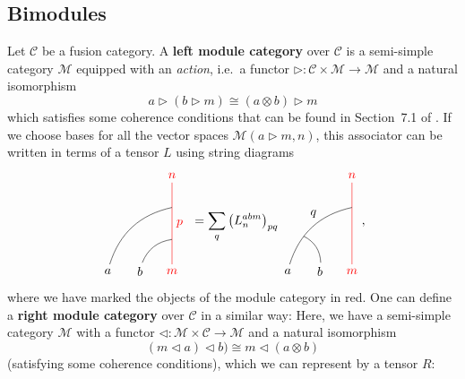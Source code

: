 \subsection{Bimodules}

\begin{definition}
	Let $\mathcal{C}$ be a fusion category. A \textbf{left module category} over $\mathcal{C}$ is a semi-simple category $\mathcal{M}$ equipped with an \emph{action}, i.e.\ a functor $\triangleright:\mathcal{C}\times\mathcal{M}\to\mathcal{M}$ and a natural isomorphism 
		\begin{equation}
			a\triangleright(b\triangleright m)\cong(a\otimes b)\triangleright m
		\end{equation}
	which satisfies some coherence conditions that can be found in Section~7.1 of \cite{Etingof2015}. If we choose bases for all the vector spaces $\mathcal{M}(a\triangleright m,n)$, this associator can be written in terms of a tensor $L$ using string diagrams
		\begin{equation}
			\begin{tikzpicture}[scale=0.9,baseline=(current bounding box.center)]
			\node[red](m) at (0,0) {$m$};
			\node(b) at (-1,0) {$b$};
			\node(a) at (-2,0) {$a$};
			\node[red](abm) at (0,3) {$n$};
			\draw[red] (m) to node[right] {$p$} (abm);
			\draw (b) to [bend left] (0,1);
			\draw (a) to [bend left] (0,2);
			\end{tikzpicture}\ =\sum_q \left(L_n^{abm}\right)_{pq}
			\begin{tikzpicture}[scale=0.9,baseline=(current bounding box.center)]
			\node[red](m) at (0,0) {$m$};
			\node(b) at (-1,0) {$b$};
			\node(a) at (-2,0) {$a$};
			\node[red](abm) at (0,3) {$n$};
			\node(ab) at (-1.2,1.8) {$q$};
			\draw[red] (m) to (abm);
			\draw (b) to [bend right] (-1.5,1.1);
			\draw (a) to [bend left] (0,2);
			\end{tikzpicture},
		\end{equation}
	where we have marked the objects of the module category in red. One can define a \textbf{right module category} over $\mathcal{C}$ in a similar way: Here, we have a semi-simple category $\mathcal{M}$ with a functor $\triangleleft:\mathcal{M}\times\mathcal{C}\to\mathcal{M}$ and a natural isomorphism
		\begin{equation}
			(m\triangleleft a)\triangleleft b)\cong m\triangleleft(a\otimes b)
		\end{equation}
	(satisfying some coherence conditions), which we can represent by a tensor $R$:
		\begin{equation}

\end{equation}
\end{definition}
